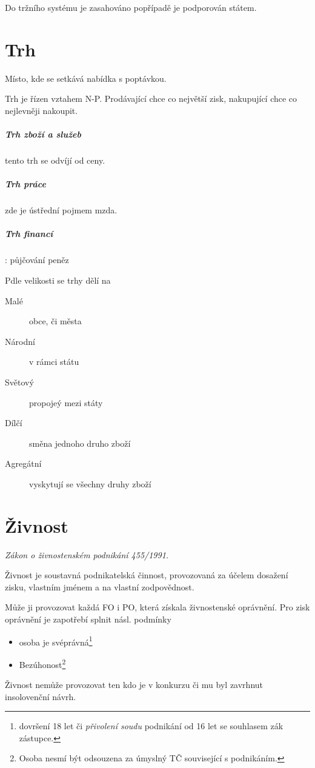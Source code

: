 \documentclass[10pt,a4paper,
twoside,%
]{report}
\begin{document}
Do tržního systému je zasahováno popřípadě je podporován státem.

\section{Trh}
\textsf{Místo, kde se setkává nabídka s poptávkou.}

Trh je řízen vztahem N-P. Prodávající chce co největší zisk, nakupující chce co nejlevněji nakoupit.

\subparagraph{Trh zboží a služeb} tento trh se odvíjí od ceny.

\subparagraph{Trh práce} zde je ústřední pojmem mzda.

\subparagraph{Trh financí}: půjčování peněz

Pdle velikosti se trhy dělí na 
\begin{description}
\item[Malé] obce, či města
\item[Národní] v rámci státu
\item[Světový] propojeý mezi státy
\item[Dílčí] směna jednoho druho zboží
\item[Agregátní] vyskytují se všechny druhy zboží
\end{description}

\section{Živnost}

\emph{Zákon o živnostenském podnikání 455/1991.}

Živnost je soustavná podnikatelská činnost, provozovaná za účelem dosažení zisku,  vlastním jménem a na vlastní zodpovědnost.

Může ji provozovat každá FO i PO, která získala živnostenské oprávnění. Pro zisk oprávnění je zapotřebí splnit násl. podmínky
\begin{multicols}{2}
\begin{itemize}
\item osoba je svéprávná\footnote{dovršení 18 let či \emph{přivolení soudu} podnikání od 16 let se souhlasem zák zástupce.}
\item Bezúhonost\footnote{Osoba nesmí být odsouzena za úmyslný TČ související s podnikáním.} 
\end{itemize}
\end{multicols}

Živnost nemůže provozovat ten kdo je v konkurzu či mu byl zavrhnut insolovenční návrh.
\end{document}
